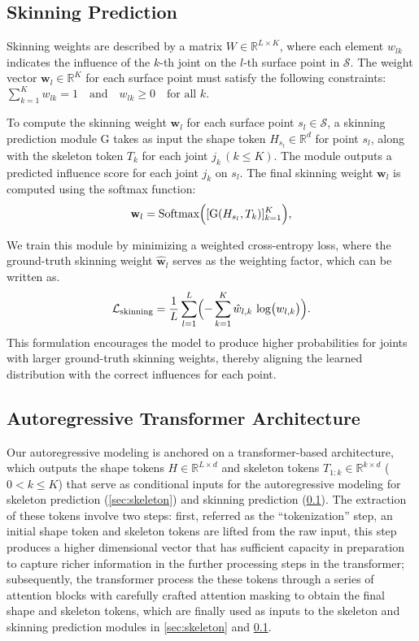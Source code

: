 \subsection{Skinning Prediction} \label{sec:skinning}
Skinning weights are described by a matrix \(W \in \mathbb{R}^{L \times K}\), where each element \(w_{lk}\) indicates the influence of the \(k\)-th joint on the \(l\)-th surface point in \(\mathcal{S}\). The weight vector \(\mathbf{w}_l \in \mathbb{R}^{K}\) for each surface point must satisfy the following constraints:
$\sum_{k=1}^{K} w_{lk} = 1 \quad \text{and} \quad w_{lk} \geq 0 \quad \text{for all } k.$

To compute the skinning weight \(\mathbf{w}_l\) for each surface point \(s_l \in \mathcal{S}\), a skinning prediction module G takes as input the shape token $H_{s_l} \in \mathbb{R}^d$ for point $s_l$, along with 
the skeleton token \(T_k\) for each joint \(j_k \, (k \leq K)\). The module outputs a predicted influence score for each joint \(j_k\) on \(s_l\). The final skinning weight \(\mathbf{w}_l\) is computed using the softmax function:
\begin{equation}
\mathbf{w}_l = \text{Softmax}\Bigl([\text{G}(H_{s_l}, T_k)]_{k=1}^{K}\Bigr),    
\end{equation}

We train this module by minimizing a weighted cross-entropy loss, where the ground-truth skinning weight $\hat{\mathbf{w}}_l$ serves as the weighting factor, which can be written as. %
\begin{equation}
    \mathcal{L}_{\text{skinning}}
    = \frac{1}{L} \sum_{l=1}^{L} 
    \Bigl(- \sum_{k=1}^{K} \hat{w}_{l,k} \,\log\bigl(w_{l,k}\bigr)\Bigr).
\end{equation}
This formulation encourages the model to produce higher probabilities for joints with larger ground-truth skinning weights, thereby aligning the learned distribution with the correct influences for each point.

\subsection{Autoregressive Transformer Architecture}\label{sec:transformer}
Our autoregressive modeling is anchored on a transformer-based architecture, which outputs the shape tokens $H\in \mathbb{R}^{L \times d}$ and skeleton tokens $T_{1:k}\in\mathbb{R}^{k\times d}$ ($0< k\leq K$) that serve as conditional inputs for the autoregressive modeling for skeleton prediction (\cref{sec:skeleton}) and skinning prediction (\cref{sec:skinning}).
The extraction of these tokens involve two steps: first, referred as the ``tokenization'' step, an initial shape token and skeleton tokens are lifted from the raw input, this step produces a higher dimensional vector that has sufficient capacity in preparation to capture richer information in the further processing steps in the transformer; subsequently, the transformer process the these tokens through a series of attention blocks with carefully crafted attention masking to obtain the final shape and skeleton tokens, which are finally used as inputs to the skeleton and skinning prediction modules in \cref{sec:skeleton} and \cref{sec:skinning}.

